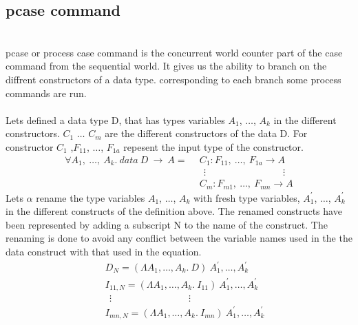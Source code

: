 \documentclass[11pt]{article}
\begin{document}
\subsection {pcase command}
~~\\
{\sf pcase} or {\sf process case} command is the concurrent world counter part of the case command from the sequential world. It gives us the ability to branch on the diffrent constructors of a data type. corresponding to each branch some process commands are run.
~~\\~~\\
Lets defined a data type D, that has types variables $A_1$, $\ldots$, $A_k$ in the different constructors. $C_1$ $\ldots$ $C_m$ are the different constructors of the data D.
For constructor $C_1$ ,$F_{11}$, $\ldots$, $F_{1a}$ repesent the input type of the constructor. 
\begin{align*} 
\forall A_1,~ \ldots,~A_k.~data~ D ~\to~ A =
 & ~~ C_1 : F_{11},~ \ldots, ~ F_{1a} \to A \\
 & ~~~~ \vdots \qquad\qquad \qquad\qquad \vdots \\ 
 & ~~ C_m : F_{m1} ,~ \ldots, ~ F_{mn} \to A
\end{align*}
Lets $\alpha$ rename the type variables $A_1$, $\ldots$, $A_k$ with fresh type variables, $A_1^{\prime}$, $\ldots$, $A_k^{\prime}$   in the different constructs of the definition above. The renamed constructs have been represented by adding a subscript N to the name of the construct. The renaming is done to avoid any conflict between the variable names used in the the data construct with that used in the equation. 
\begin{align*} 
 & ~~ D_N = (\Lambda A_1,\ldots,A_k.~D)~A_1^{\prime},\ldots,A_k^{\prime} \\
 & ~~ I_{11,N} = (\Lambda A_1,\ldots,A_k.~ I_{11})~A_1^{\prime},\ldots,A_k^{\prime} \\
 & ~~~~ \vdots \qquad\qquad \qquad\qquad \vdots \\ 
 & ~~ I_{mn,N} = (\Lambda A_1,\ldots,A_k.~ I_{mn})~A_1^{\prime},\ldots,A_k^{\prime} \\
\end{align*}
\end{document}
